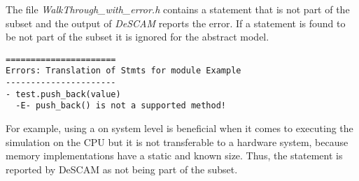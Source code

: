 The file \textit{WalkThrough\_with\_error.h} contains a statement that is not part of the subset and the output of \textit{DeSCAM} reports the error. %
If a statement is found to be not part of the subset it is ignored for the abstract model. %
\newpage
\begin{small}
\begin{verbatim}
======================
Errors: Translation of Stmts for module Example
----------------------
- test.push_back(value)
  -E- push_back() is not a supported method!
\end{verbatim}
\end{small}
For example, using a  on system level is
beneficial when it comes to executing the simulation on the CPU but it
is not transferable to a hardware system, because memory
implementations have a static and known size. %
Thus, the statement is reported by DeSCAM as not being part of the
subset. %
